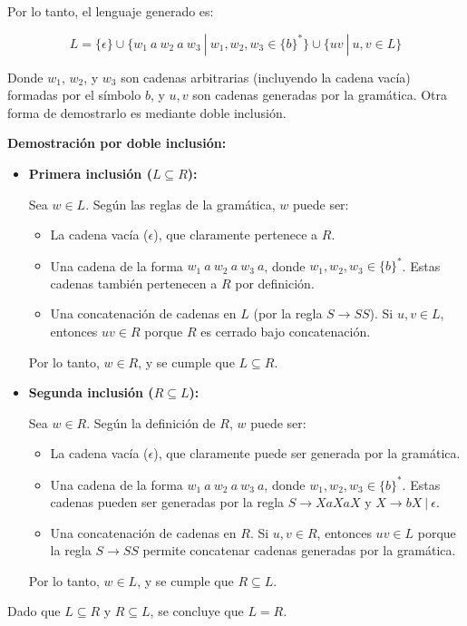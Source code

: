 \documentclass[12pt]{report} %
\begin{document}
\begin{enumerate}
\begin{solucion}[Ejercicio 1.d]
   Por lo tanto, el lenguaje generado es:

   $$
   L = \{ \epsilon \} \cup \{ w_1 \ a \ w_2 \ a \ w_3  \ | \ w_1, w_2, w_3 \in \{b\}^* \} \cup \{ uv \ | \ u, v \in L \}
   $$

   Donde $w_1$, $w_2$, y $w_3$ son cadenas arbitrarias (incluyendo la cadena vacía) formadas por el símbolo $b$, y $u, v$ son cadenas generadas por la gramática. Otra forma de demostrarlo es mediante doble inclusión.

   \textbf{Demostración por doble inclusión:}

   \begin{itemize}
       \item \textbf{Primera inclusión ($L \subseteq R$):}

           Sea $w \in L$. Según las reglas de la gramática, $w$ puede ser:
           \begin{itemize}
               \item La cadena vacía ($\epsilon$), que claramente pertenece a $R$.
               \item Una cadena de la forma $w_1 \ a \ w_2 \ a \ w_3 \ a$, donde $w_1, w_2, w_3 \in \{b\}^*$. Estas cadenas también pertenecen a $R$ por definición.
               \item Una concatenación de cadenas en $L$ (por la regla $S \to SS$). Si $u, v \in L$, entonces $uv \in R$ porque $R$ es cerrado bajo concatenación.
           \end{itemize}

           Por lo tanto, $w \in R$, y se cumple que $L \subseteq R$.

       \item \textbf{Segunda inclusión ($R \subseteq L$):}

           Sea $w \in R$. Según la definición de $R$, $w$ puede ser:
           \begin{itemize}
               \item La cadena vacía ($\epsilon$), que claramente puede ser generada por la gramática.
               \item Una cadena de la forma $w_1 \ a \ w_2 \ a \ w_3 \ a$, donde $w_1, w_2, w_3 \in \{b\}^*$. Estas cadenas pueden ser generadas por la regla $S \to XaXaX$ y $X \to bX \ | \ \epsilon$.
               \item Una concatenación de cadenas en $R$. Si $u, v \in R$, entonces $uv \in L$ porque la regla $S \to SS$ permite concatenar cadenas generadas por la gramática.
           \end{itemize}

           Por lo tanto, $w \in L$, y se cumple que $R \subseteq L$.
   \end{itemize}

   Dado que $L \subseteq R$ y $R \subseteq L$, se concluye que $L = R$.

   \end{solucion}
\end{enumerate}
\end{document}
